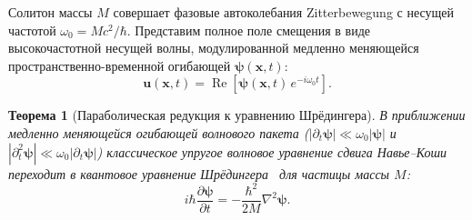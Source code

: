 \documentclass[11pt,a4paper]{article}
\newtheorem{theorem}{Теорема}
\theoremstyle{definition}
\theoremstyle{remark}
\begin{document}
Солитон массы $M$ совершает фазовые автоколебания Zitterbewegung с несущей частотой $\omega_0 = M c^2 / \hbar$. Представим полное поле смещения в виде высокочастотной несущей волны, модулированной медленно меняющейся пространственно-временной огибающей $\boldsymbol{\psi}(\mathbf{x}, t)$:
\begin{equation}
\mathbf{u}(\mathbf{x}, t) = \operatorname{Re}\left[ \boldsymbol{\psi}(\mathbf{x}, t) \, e^{-i \omega_0 t} \right].
\label{eq:envelope_ansatz}
\end{equation}

\begin{theorem}[Параболическая редукция к уравнению Шрёдингера]
\label{thm:schroedinger_derivation}
В приближении медленно меняющейся огибающей волнового пакета ($|\partial_t \boldsymbol{\psi}| \ll \omega_0 |\boldsymbol{\psi}|$ и $|\partial_t^2 \boldsymbol{\psi}| \ll \omega_0 |\partial_t \boldsymbol{\psi}|$) классическое упругое волновое уравнение сдвига Навье--Коши переходит в квантовое уравнение Шрёдингера~\cite{Schrodinger1926} для частицы массы $M$:
\begin{equation}
	i\hbar \frac{\partial \boldsymbol{\psi}}{\partial t} = -\frac{\hbar^2}{2M} \nabla^2 \boldsymbol{\psi}.
	\label{eq:schroedinger_exact}
\end{equation}
\end{theorem}
\end{document}
